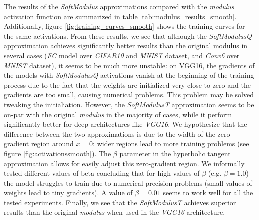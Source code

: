 The results of the \textit{SoftModulus} approximations compared with the \textit{modulus} activation function are summarized in table \ref{tab:modulus_results_smooth}. Additionally, figure \ref{fig:training_curves_smooth} shows the training curves for the same activations. From these results, we see that although the \textit{SoftModulusQ} approximation achieves significantly better results than the original modulus in several cases (\textit{FC} model over \textit{CIFAR10} and \textit{MNIST} dataset, and \textit{Conv6} over \textit{MNIST} dataset), it seems to be much more unstable: on VGG16, the gradients of the models with \textit{SoftModulusQ} activations vanish at the beginning of the training process due to the fact that the weights are initialized very close to zero and the gradients are too small, causing numerical problems. This problem may be solved tweaking the initialiation. However, the \textit{SoftModulusT} approximation seems to be on-par with the original \textit{modulus} in the majority of cases, while it perform significantly better for deep architectures like \textit{VGG16}. We hypothesize that the difference between the two approximations is due to the width of the zero gradient region around $x=0$: wider regions lead to more training problems (see figure \ref{fig:activationssmooth}). The $\beta$ parameter in the hyperbolic tangent approximation allows for easily adjust this zero-gradient region. We informally tested different values of beta concluding that for high values of $\beta$ (e.g. $\beta=1.0$) the model struggles to train due to numerical precision problems (small values of weights lead to tiny gradients). A value of $\beta=0.01$ seems to work well for all the tested experiments. Finally, we see that the \textit{SoftModulusT} achieves superior results than the original \textit{modulus} when used in the \textit{VGG16} architecture.


